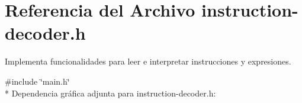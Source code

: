 \hypertarget{instruction-decoder_8h}{}\section{Referencia del Archivo instruction-\/decoder.h}
\label{instruction-decoder_8h}


Implementa funcionalidades para leer e interpretar instrucciones y expresiones.  


{\ttfamily \#include \char`\"{}main.\+h\char`\"{}}\\*
Dependencia gráfica adjunta para instruction-\/decoder.h\+:

